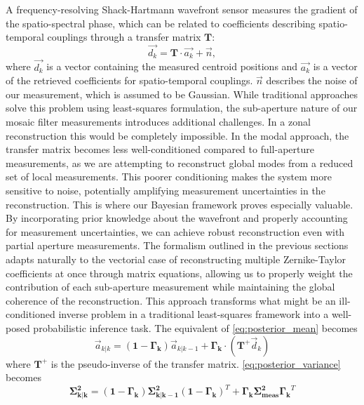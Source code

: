\documentclass[9pt, twocolumn,superscriptaddress]{revtex4}
\begin{document}
A frequency-resolving Shack-Hartmann wavefront sensor measures the gradient of the spatio-spectral phase, which can be related to coefficients describing spatio-temporal couplings through a transfer matrix $\mathbf{T}$:
\begin{equation}
    \vec{d_k} = \mathbf{T} \cdot \vec{a_k}+\vec{n},
    \label{eq:transfer_equation}
\end{equation}
where $\vec{d_k}$ is a vector containing the measured centroid positions and $\vec{a_k}$ is a vector of the retrieved coefficients for spatio-temporal couplings. $\vec{n}$ describes the noise of our measurement, which is assumed to be Gaussian. While traditional approaches solve this problem using least-squares formulation, the sub-aperture nature of our mosaic filter measurements introduces additional challenges. In a zonal reconstruction this would be completely impossible. In the modal approach, the transfer matrix becomes less well-conditioned compared to full-aperture measurements, as we are attempting to reconstruct global modes from a reduced set of local measurements. This poorer conditioning makes the system more sensitive to noise, potentially amplifying measurement uncertainties in the reconstruction. This is where our Bayesian framework proves especially valuable. By incorporating prior knowledge about the wavefront and properly accounting for measurement uncertainties, we can achieve robust reconstruction even with partial aperture measurements. The formalism outlined in the previous sections adapts naturally to the vectorial case of reconstructing multiple Zernike-Taylor coefficients at once through matrix equations, allowing us to properly weight the contribution of each sub-aperture measurement while maintaining the global coherence of the reconstruction. This approach transforms what might be an ill-conditioned inverse problem in a traditional least-squares framework into a well-posed probabilistic inference task.
The equivalent of \cref{eq:posterior_mean} becomes
\begin{equation}
    \vec{a}_{k|k} = \left(\mathbf{1}-\boldsymbol{\Gamma_k}\right) \vec{a}_{k|k-1} + \boldsymbol{\Gamma_k}\cdot \left( \mathbf{T^+} \vec{d}_k \right)
\end{equation}
where $\mathbf{T^+}$ is the pseudo-inverse of the transfer matrix. 
\cref{eq:posterior_variance} becomes 
\begin{equation}
    \boldsymbol{\Sigma^2_{k|k}} = \left( \mathbf{1}-\boldsymbol{\Gamma_k} \right) \boldsymbol{\Sigma^2_{k|k-1}} \left( \mathbf{1}-\boldsymbol{\Gamma_k} \right)^T + \boldsymbol{\Gamma_k} \boldsymbol{\Sigma^2_\text{meas}} \boldsymbol{\Gamma_k}^T
\end{equation}
\end{document}
